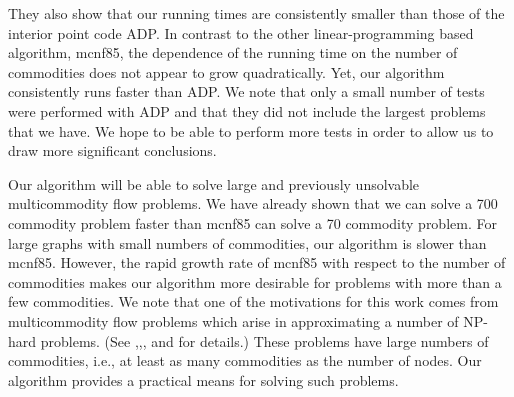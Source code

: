 They also show that our running times are consistently smaller than
those of the interior point code ADP. In contrast to the other
linear-programming based algorithm, {\sc mcnf85}, the dependence of
the running time on the number of commodities does not appear to grow
quadratically.  Yet, our algorithm consistently runs faster than ADP.
We note that only a small number of tests were performed with ADP and
that they did not include the largest problems that we have.  We hope
to be able to perform more tests in order to allow us to draw more
significant conclusions.

Our algorithm will be able to solve large and previously unsolvable
multicommodity flow problems.
We have already shown that we can solve a 700 commodity problem faster than
{\sc mcnf85} can solve a 70 commodity problem.  
For large graphs with small numbers of commodities, 
our algorithm is slower than {\sc mcnf85}.
However, the rapid growth rate of {\sc mcnf85} 
with respect to the number of commodities makes our algorithm more
desirable for problems with more than a few commodities.
We note that one of the motivations for this work comes from 
multicommodity flow problems which arise in approximating a number of 
NP-hard problems.
(See \cite{LeightonR88},\cite{KleinARR90},\cite{KleinPST91}, and
\cite{LeightonMPSTT91} for details.)
These problems have large numbers of commodities, i.e., at least as many
commodities as the number of nodes.
Our algorithm provides a practical means for solving such problems.

